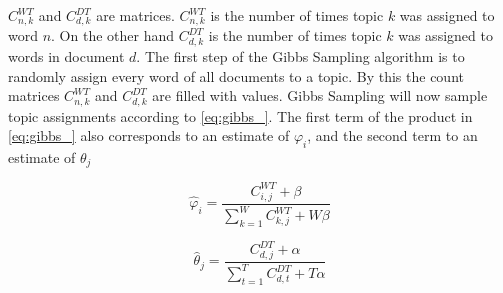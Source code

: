 \documentclass[a4paper,ngerman, english]{atseminar}
\begin{document}
$C_{n,k}^{WT}$ and $C_{d,k}^{DT}$ are matrices. $C_{n,k}^{WT}$ is the number of times topic $k$ was assigned to 
word $n$. On the other hand $C_{d,k}^{DT}$ is the number of times topic $k$ was assigned to words in document $d$.
\noindent
The first step of the Gibbs Sampling algorithm is to randomly assign every word of all documents to a topic. By this 
the count matrices $C_{n,k}^{WT}$ and $C_{d,k}^{DT}$ are filled with values.
Gibbs Sampling will now sample topic assignments according to \autoref{eq:gibbs_}.
\noindent
The first term of the product in \autoref{eq:gibbs_} also corresponds to an estimate of $\varphi_i$, 
and the second term to an estimate of $\theta_j$

\begin{equation}
\hat{\varphi}_i = \frac{C_{i,j}^{WT}+\beta} {\sum_{k=1}^{W}C_{k,j}^{WT}+W\beta}
\end{equation}

\begin{equation}
\hat{\theta}_j = \frac{C_{d,j}^{DT}+\alpha}{\sum_{t=1}^{T}C_{d,t}^{DT}+T\alpha}
\end{equation}
\end{document}
